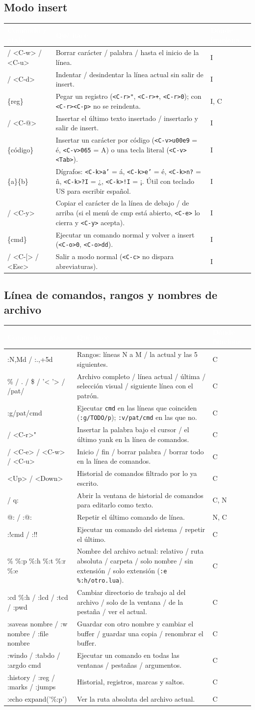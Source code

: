 \documentclass[8pt,a4paper,landscape]{extarticle}
\newcommand{\kk}[1]{\texttt{#1}}
\newenvironment{cht}{%
  \begin{longtable}{>{\raggedright\arraybackslash\ttfamily}p{0.27\textwidth}
                    >{\raggedright\arraybackslash}p{0.46\textwidth}
                    >{\raggedright\arraybackslash}p{0.21\textwidth}}
  \rowcolor{accent}\textcolor{white}{\textbf{\rmfamily Comando / atajo}} &
  \textcolor{white}{\textbf{Qué hace}} & \textcolor{white}{\textbf{Dónde funciona}} \\
  \endhead
}{\end{longtable}}
\newcommand{\rr}[3]{#1 & #2 & #3 \\}
\newcommand{\rg}[3]{\rowcolor{rowgray}\relax #1 & #2 & #3 \\}
\let\oldsubsection\subsection
\renewcommand{\subsection}{\Needspace{9\baselineskip}\oldsubsection}
\begin{document}
\subsection{Modo insert}
\begin{cht}
\rg{<C-h> / <C-w> / <C-u>}{Borrar carácter / palabra / hasta el inicio de la línea.}{I}
\rr{<C-t> / <C-d>}{Indentar / desindentar la línea actual sin salir de insert.}{I}
\rg{<C-r>\{reg\}}{Pegar un registro (\kk{<C-r>"}, \kk{<C-r>+}, \kk{<C-r>0}); con \kk{<C-r><C-p>} no se reindenta.}{I, C}
\rr{<C-a> / <C-@>}{Insertar el último texto insertado / insertarlo y salir de insert.}{I}
\rg{<C-v>\{código\}}{Insertar un carácter por código (\kk{<C-v>u00e9} = é, \kk{<C-v>065} = A) o una tecla literal (\kk{<C-v><Tab>}).}{I}
\rr{<C-k>\{a\}\{b\}}{Dígrafos: \kk{<C-k>a'} = á, \kk{<C-k>e'} = é, \kk{<C-k>n?} = ñ, \kk{<C-k>?I} = ¿, \kk{<C-k>!I} = ¡. Útil con teclado US para escribir español.}{I}
\rg{<C-e> / <C-y>}{Copiar el carácter de la línea de debajo / de arriba (si el menú de cmp está abierto, \kk{<C-e>} lo cierra y \kk{<C-y>} acepta).}{I}
\rr{<C-o>\{cmd\}}{Ejecutar un comando normal y volver a insert (\kk{<C-o>0}, \kk{<C-o>dd}).}{I}
\rg{<C-c> / <C-[> / <Esc>}{Salir a modo normal (\kk{<C-c>} no dispara abreviaturas).}{I}
\end{cht}

\subsection{Línea de comandos, rangos y nombres de archivo}
\begin{cht}
\rg{:N,Md / :.,+5d}{Rangos: líneas N a M / la actual y las 5 siguientes.}{C}
\rr{\% / . / \$ / '< '> / /pat/}{Archivo completo / línea actual / última / selección visual / siguiente línea con el patrón.}{C}
\rg{:g/pat/cmd}{Ejecutar \kk{cmd} en las líneas que coinciden (\kk{:g/TODO/p}); \kk{:v/pat/cmd} en las que no.}{C}
\rr{<C-r><C-w> / <C-r>"}{Insertar la palabra bajo el cursor / el último yank en la línea de comandos.}{C}
\rg{<C-b> / <C-e> / <C-w> / <C-u>}{Inicio / fin / borrar palabra / borrar todo en la línea de comandos.}{C}
\rr{<Up> / <Down>}{Historial de comandos filtrado por lo ya escrito.}{C}
\rg{<C-f> / q:}{Abrir la ventana de historial de comandos para editarlo como texto.}{C, N}
\rr{@: / :@:}{Repetir el último comando de línea.}{N, C}
\rg{:!cmd / :!!}{Ejecutar un comando del sistema / repetir el último.}{C}
\rr{\%  \%:p  \%:h  \%:t  \%:r  \%:e}{Nombre del archivo actual: relativo / ruta absoluta / carpeta / solo nombre / sin extensión / solo extensión (\kk{:e \%:h/otro.lua}).}{C}
\rg{:cd \%:h / :lcd / :tcd / :pwd}{Cambiar directorio de trabajo al del archivo / solo de la ventana / de la pestaña / ver el actual.}{C}
\rr{:saveas nombre / :w nombre / :file nombre}{Guardar con otro nombre y cambiar el buffer / guardar una copia / renombrar el buffer.}{C}
\rg{:windo / :tabdo / :argdo cmd}{Ejecutar un comando en todas las ventanas / pestañas / argumentos.}{C}
\rr{:history / :reg / :marks / :jumps}{Historial, registros, marcas y saltos.}{C}
\rg{:echo expand('\%:p')}{Ver la ruta absoluta del archivo actual.}{C}
\end{cht}
\end{document}
